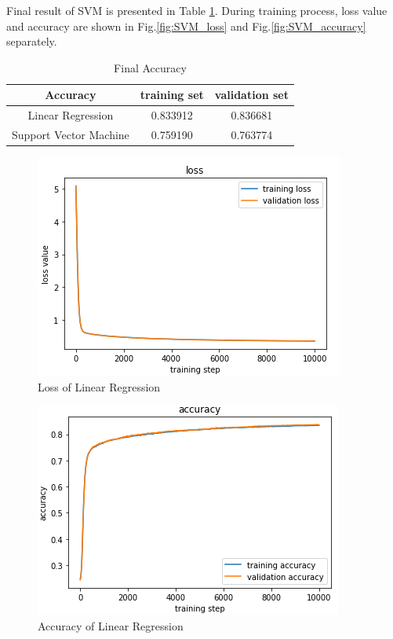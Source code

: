 \documentclass[journal, a4paper]{IEEEtran}
\begin{document}
Final result of SVM is presented in Table \ref{tab:final accuracy}. During training process, loss value and accuracy are shown in Fig.\ref{fig:SVM_loss} and Fig.\ref{fig:SVM_accuracy} separately.
\begin{table}
  \centering
  \caption{Final Accuracy}\label{tab:final accuracy}
  \begin{tabular}{c|cc}
    \hline
    Accuracy & training set & validation set \\
    \hline
    Linear Regression & 0.833912 & 0.836681 \\
    Support Vector Machine & 0.759190 & 0.763774 \\
    \hline
  \end{tabular}
\end{table}
\begin{figure}[!hbt]
\begin{center}
    \includegraphics[width=\columnwidth]{LR_loss}
    \caption{Loss of Linear Regression}
    \label{fig:LR_loss}
\end{center}
\end{figure}
\begin{figure}[!hbt]
\begin{center}
    \includegraphics[width=\columnwidth]{LR_accuracy}
    \caption{Accuracy of Linear Regression}
    \label{fig:LR_accuracy}
\end{center}
\end{figure}
\end{document}
